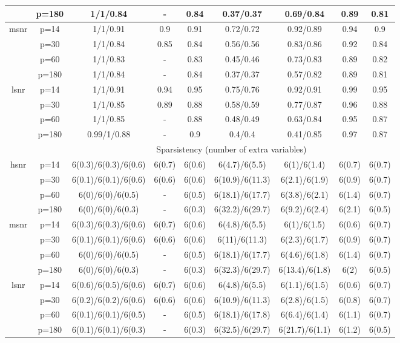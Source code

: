 \begin{table}[ht]
{\begin{tabular}{|c|c|ccccccc|}
   & p=180 & 1/1/0.84 & - & 0.84 & 0.37/0.37 & 0.69/0.84 & 0.89 & 0.81 \\ 
  \midrule\multirow{4}[2]{*}{msnr} & p=14 & 1/1/0.91 & 0.9 & 0.91 & 0.72/0.72 & 0.92/0.89 & 0.94 & 0.9 \\ 
   & p=30 & 1/1/0.84 & 0.85 & 0.84 & 0.56/0.56 & 0.83/0.86 & 0.92 & 0.84 \\ 
   & p=60 & 1/1/0.83 & - & 0.83 & 0.45/0.46 & 0.73/0.83 & 0.89 & 0.82 \\ 
   & p=180 & 1/1/0.84 & - & 0.84 & 0.37/0.37 & 0.57/0.82 & 0.89 & 0.81 \\ 
  \midrule\multirow{4}[2]{*}{lsnr} & p=14 & 1/1/0.91 & 0.94 & 0.95 & 0.75/0.76 & 0.92/0.91 & 0.99 & 0.95 \\ 
   & p=30 & 1/1/0.85 & 0.89 & 0.88 & 0.58/0.59 & 0.77/0.87 & 0.96 & 0.88 \\ 
   & p=60 & 1/1/0.85 & - & 0.88 & 0.48/0.49 & 0.63/0.84 & 0.95 & 0.87 \\ 
   & p=180 & 0.99/1/0.88 & - & 0.9 & 0.4/0.4 & 0.41/0.85 & 0.97 & 0.87 \\ 
   \midrule 
 \multicolumn{1}{|c}{} &       & \multicolumn{7}{c|}{Sparsistency (number of extra variables)} \\
\midrule\multirow{4}[2]{*}{hsnr} & p=14 & 6(0.3)/6(0.3)/6(0.6) & 6(0.7) & 6(0.6) & 6(4.7)/6(5.5) & 6(1)/6(1.4) & 6(0.7) & 6(0.7) \\ 
   & p=30 & 6(0.1)/6(0.1)/6(0.6) & 6(0.6) & 6(0.6) & 6(10.9)/6(11.3) & 6(2.1)/6(1.9) & 6(0.9) & 6(0.7) \\ 
   & p=60 & 6(0)/6(0)/6(0.5) & - & 6(0.5) & 6(18.1)/6(17.7) & 6(3.8)/6(2.1) & 6(1.4) & 6(0.7) \\ 
   & p=180 & 6(0)/6(0)/6(0.3) & - & 6(0.3) & 6(32.2)/6(29.7) & 6(9.2)/6(2.4) & 6(2.1) & 6(0.5) \\ 
  \midrule\multirow{4}[2]{*}{msnr} & p=14 & 6(0.3)/6(0.3)/6(0.6) & 6(0.7) & 6(0.6) & 6(4.8)/6(5.5) & 6(1)/6(1.5) & 6(0.6) & 6(0.7) \\ 
   & p=30 & 6(0.1)/6(0.1)/6(0.6) & 6(0.6) & 6(0.6) & 6(11)/6(11.3) & 6(2.3)/6(1.7) & 6(0.9) & 6(0.7) \\ 
   & p=60 & 6(0)/6(0)/6(0.5) & - & 6(0.5) & 6(18.1)/6(17.7) & 6(4.6)/6(1.8) & 6(1.4) & 6(0.7) \\ 
   & p=180 & 6(0)/6(0)/6(0.3) & - & 6(0.3) & 6(32.3)/6(29.7) & 6(13.4)/6(1.8) & 6(2) & 6(0.5) \\ 
  \midrule\multirow{4}[2]{*}{lsnr} & p=14 & 6(0.6)/6(0.5)/6(0.6) & 6(0.7) & 6(0.6) & 6(4.8)/6(5.5) & 6(1.1)/6(1.5) & 6(0.6) & 6(0.7) \\ 
   & p=30 & 6(0.2)/6(0.2)/6(0.6) & 6(0.6) & 6(0.6) & 6(10.9)/6(11.3) & 6(2.8)/6(1.5) & 6(0.8) & 6(0.7) \\ 
   & p=60 & 6(0.1)/6(0.1)/6(0.5) & - & 6(0.5) & 6(18.1)/6(17.8) & 6(6.4)/6(1.4) & 6(1.1) & 6(0.7) \\ 
   & p=180 & 6(0.1)/6(0.1)/6(0.3) & - & 6(0.3) & 6(32.5)/6(29.7) & 6(21.7)/6(1.1) & 6(1.2) & 6(0.5) \\ 
   \bottomrule 
\end{tabular}
}
\end{table}
